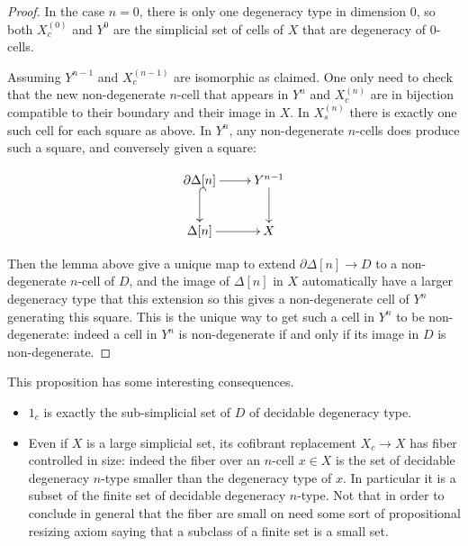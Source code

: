 \documentclass[reqno,10pt,a4paper,oneside,draft]{amsart}
\begin{document}
\begin{proof}
In the case $n=0$, there is only one degeneracy type in dimension $0$, so both $X^{(0)}_c$ and $Y^0$ are the simplicial set of cells of $X$ that are degeneracy of $0$-cells.

Assuming $Y^{n-1}$ and $X^{(n-1)}_c$ are isomorphic as claimed. One only need to check that the new non-degenerate $n$-cell that appears in $Y^{n}$ and $X^{(n)}_c$ are in bijection compatible to their boundary and their image in $X$.
In $X^{(n)}_s$ there is exactly one such cell for each square as above. In $Y^{n}$, any non-degenerate $n$-cells does produce such a square, and conversely given a square:

\[ \xymatrix{\partial \Delta[n]  \ar[r] \ar@{^{(}->}[d] & Y^{n-1} \ar[d] \\ \Delta[n]  \ar[r] & X} \]

Then the lemma above give a unique map to extend $\partial \Delta[n] \rightarrow D$ to a non-degenerate $n$-cell of $D$, and the image of $\Delta[n]$ in $X$ automatically have a larger degeneracy type that this extension so this gives a non-degenerate cell of $Y^{n}$ generating this square. This is the unique way to get such a cell in $Y^n$ to be non-degenerate: indeed a cell in $Y^n$ is non-degenerate if and only if its image in $D$ is non-degenerate.
\end{proof}


\begin{remark} 
This proposition has some interesting consequences.
\begin{itemize}
\item $1_c$ is exactly the sub-simplicial set of $D$ of decidable degeneracy type.
\item Even if $X$ is a large simplicial set, its cofibrant replacement $X_c \rightarrow X$ has fiber controlled in size: indeed the fiber over an $n$-cell $x \in X$ is the set of decidable degeneracy $n$-type smaller than the degeneracy type of $x$. In particular it is a subset of the finite set of decidable degeneracy $n$-type. Not that in order to conclude in general that the fiber are small on need some sort of propositional resizing axiom saying that a subclass of a finite set is a small set.
\end{itemize}
\end{remark}








\end{document}
